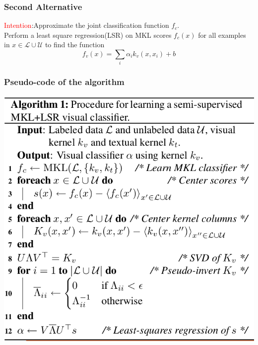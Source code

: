 \documentclass{beamer}
\begin{document}
\begin{CJK*}{UTF8}{gbsn}
\begin{frame}\frametitle{Second Alternative}
\textcolor{red}{Intention}:Approximate the joint classification function $f_c$.\\
Perform a least square regression(LSR) on MKL scores $f_c(x)$ for all examples in $x\in\mathcal{L}\cup\mathcal{U}$ to find the function 
\[
f_v(x)=\sum_i\alpha_ik_v(x,x_i)+b
\]
\end{frame}

\begin{frame}\frametitle{Pseudo-code of the algorithm}
\begin{center}
\includegraphics[scale=0.3]{images/algorithm}
\end{center}
\end{frame}

\end{CJK*}
\end{document}
